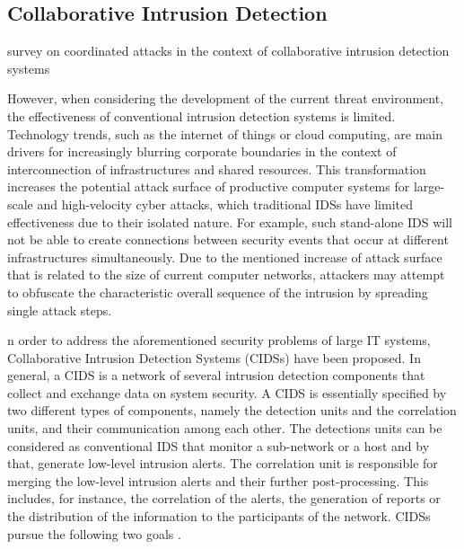\subsection{Collaborative Intrusion Detection}





survey on coordinated attacks in the context of collaborative intrusion detection systems\cite{Zhou2010}

However, when considering the development of the current threat environment, the effectiveness of conventional intrusion detection systems is limited. Technology trends, such as the internet of things or cloud computing, are main drivers for increasingly blurring corporate boundaries in the context of interconnection of infrastructures and shared resources. This transformation increases the potential attack surface of productive computer systems for large-scale and high-velocity cyber attacks, which traditional IDSs have limited effectiveness due to their isolated nature. For example, such stand-alone IDS will not be able to create connections between security events that occur at different infrastructures simultaneously. Due to the mentioned increase of attack surface that is related to the size of current computer networks, attackers may attempt to obfuscate the characteristic overall sequence of the intrusion by spreading single attack steps.

n order to address the aforementioned security problems of large IT systems, Collaborative Intrusion Detection Systems (CIDSs) have been proposed. In general, a CIDS is a network of several intrusion detection components that collect and exchange data on system security. A CIDS is essentially specified by two different types of components, namely the detection units and the correlation units, and their communication among each other. The detections units can be considered as conventional IDS that monitor a sub-network or a host and by that, generate low-level intrusion alerts. The correlation unit is responsible for merging the low-level intrusion alerts and their further post-processing. This includes, for instance, the correlation of the alerts, the generation of reports or the distribution of the information to the participants of the network. CIDSs pursue the following two goals \cite[24]{vasilomanolakis_collaborative_2016}.


